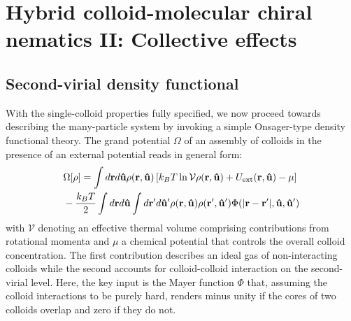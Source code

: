 
\chapter{Hybrid colloid-molecular chiral nematics II: Collective effects}
\label{col_cholesterics}


\section{Second-virial density functional }

 With the single-colloid properties fully specified, we now proceed towards describing the many-particle system by invoking a simple Onsager-type density functional theory. The grand potential $\Omega$ of an assembly of colloids in the presence of an external  potential  reads in general form:
 \begin{align}
 &  \Omega[\rho ]  = \int d {\bf r} d {\bf \hat{u}}  \rho({\bf r}, {\bf \hat{u}}) \left [k_{B}T \ln {\mathcal V}   \rho({\bf r}, {\bf \hat{u}})  +   U_{\rm ext}({\bf r}, {\bf \hat{u}}) - \mu  \right ] \nonumber \\
 & -\frac{k_{B}T}{2} \int d {\bf r} d {\bf \hat{u}} \int d {\bf r}^{\prime} d {\bf \hat{u}}^{\prime}  \rho({\bf r}, {\bf \hat{u}})  \rho({\bf r}^{\prime}, {\bf \hat{u}}^{\prime}) \Phi(|{\bf r} - {\bf r}^{\prime}|, {\bf \hat{u}}, {\bf \hat{u}}^{\prime} )
 \label{grandpot}
 \end{align}
 with ${\mathcal V}$ denoting an effective thermal volume comprising contributions from rotational momenta and $\mu$ a chemical potential that controls the overall colloid concentration.  The first contribution describes an ideal gas of  non-interacting colloids while the second accounts for colloid-colloid interaction on the second-virial level. Here, the key input is the Mayer function $\Phi$  that, assuming the colloid interactions to be purely hard, renders minus unity if the cores of two colloids overlap and zero if they do not.

